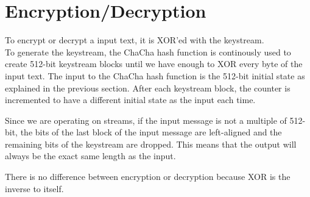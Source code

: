 \section{Encryption/Decryption}
\label{sec:chacha.encryption}

To encrypt or decrypt a input text, it is XOR'ed with the keystream. \\
To generate the keystream, the ChaCha hash function is continously used to create 512-bit keystream blocks until we have enough to XOR every byte of the input text. The input to the ChaCha hash function is the 512-bit initial state as explained in the previous section. After each keystream block, the counter is incremented to have a different initial state as the input each time.

Since we are operating on streams, if the input message is not a multiple of 512-bit, the bits of the last block of the input message are left-aligned and the remaining bits of the keystream are dropped. This means that the output will always be the exact same length as the input.

There is no difference between encryption or decryption because XOR is the inverse to itself.

